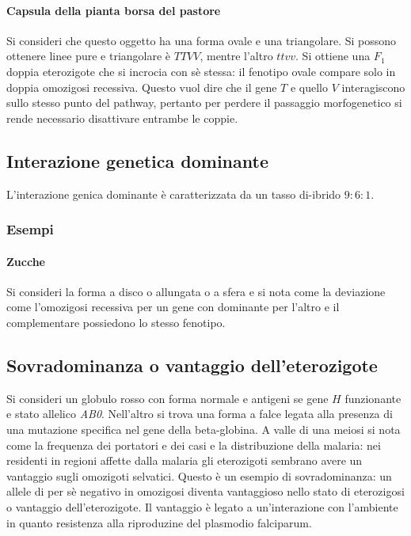 \paragraph{Capsula della pianta borsa del pastore}
Si consideri che questo oggetto ha una forma ovale e una triangolare. Si possono ottenere linee pure e triangolare \`e $TTVV$, mentre l'altro $ttvv$. Si ottiene una $F_1$ doppia 
eterozigote che si incrocia con s\`e stessa: il fenotipo ovale compare solo in doppia omozigosi recessiva. Questo vuol dire che il gene $T$ e quello $V$ interagiscono sullo stesso
punto del pathway, pertanto per perdere il passaggio morfogenetico si rende necessario disattivare entrambe le coppie.
\subsection{Interazione genetica dominante}
L'interazione genica dominante \`e caratterizzata da un tasso di-ibrido $9:6:1$. 
\subsubsection{Esempi}
\paragraph{Zucche} 
Si consideri la forma a disco o allungata o a sfera e si nota come la deviazione come l'omozigosi recessiva per un gene con dominante per l'altro e il complementare possiedono lo 
stesso fenotipo. 
\subsection{Sovradominanza o vantaggio dell'eterozigote}
Si consideri un globulo rosso con forma normale e antigeni se gene $H$ funzionante e stato allelico \emph{AB0}. Nell'altro si trova una forma a falce legata alla presenza di una
mutazione specifica nel gene della beta-globina. A valle di una meiosi si nota come la frequenza dei portatori e dei casi e la distribuzione della malaria: nei residenti in regioni
affette dalla malaria gli eterozigoti sembrano avere un vantaggio sugli omozigoti selvatici. Questo \`e un esempio di sovradominanza: un allele di per s\`e negativo in omozigosi 
diventa vantaggioso nello stato di eterozigosi o vantaggio dell'eterozigote. Il vantaggio \`e legato a un'interazione con l'ambiente in quanto resistenza alla riproduzine del 
plasmodio falciparum. 
